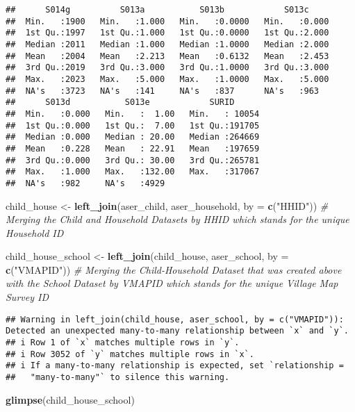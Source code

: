 \documentclass[
]{article}
\newenvironment{Shaded}{\begin{snugshade}}{\end{snugshade}}
\newcommand{\AttributeTok}[1]{\textcolor[rgb]{0.13,0.29,0.53}{#1}}
\newcommand{\CommentTok}[1]{\textcolor[rgb]{0.56,0.35,0.01}{\textit{#1}}}
\newcommand{\FunctionTok}[1]{\textcolor[rgb]{0.13,0.29,0.53}{\textbf{#1}}}
\newcommand{\NormalTok}[1]{#1}
\newcommand{\OtherTok}[1]{\textcolor[rgb]{0.56,0.35,0.01}{#1}}
\newcommand{\StringTok}[1]{\textcolor[rgb]{0.31,0.60,0.02}{#1}}
\begin{document}
\begin{verbatim}
##      S014g          S013a           S013b            S013c      
##  Min.   :1900   Min.   :1.000   Min.   :0.0000   Min.   :0.000  
##  1st Qu.:1997   1st Qu.:1.000   1st Qu.:0.0000   1st Qu.:2.000  
##  Median :2011   Median :1.000   Median :1.0000   Median :2.000  
##  Mean   :2004   Mean   :2.213   Mean   :0.6132   Mean   :2.453  
##  3rd Qu.:2019   3rd Qu.:3.000   3rd Qu.:1.0000   3rd Qu.:3.000  
##  Max.   :2023   Max.   :5.000   Max.   :1.0000   Max.   :5.000  
##  NA's   :3723   NA's   :141     NA's   :837      NA's   :963    
##      S013d           S013e            SURID       
##  Min.   :0.000   Min.   :  1.00   Min.   : 10054  
##  1st Qu.:0.000   1st Qu.:  7.00   1st Qu.:191705  
##  Median :0.000   Median : 20.00   Median :264669  
##  Mean   :0.228   Mean   : 22.91   Mean   :197659  
##  3rd Qu.:0.000   3rd Qu.: 30.00   3rd Qu.:265781  
##  Max.   :1.000   Max.   :132.00   Max.   :317067  
##  NA's   :982     NA's   :4929
\end{verbatim}

\begin{Shaded}
\begin{Highlighting}[]
\NormalTok{child\_house }\OtherTok{\textless{}{-}} \FunctionTok{left\_join}\NormalTok{(aser\_child, aser\_household, }\AttributeTok{by =} \FunctionTok{c}\NormalTok{(}\StringTok{"HHID"}\NormalTok{)) }\CommentTok{\# Merging the Child and Household Datasets by HHID which stands for the unique Household ID}

\NormalTok{child\_house\_school }\OtherTok{\textless{}{-}} \FunctionTok{left\_join}\NormalTok{(child\_house, aser\_school, }\AttributeTok{by =} \FunctionTok{c}\NormalTok{(}\StringTok{"VMAPID"}\NormalTok{)) }\CommentTok{\# Merging the Child{-}Household Dataset that was created above with the School Dataset by VMAPID which stands for the unique Village Map Survey ID}
\end{Highlighting}
\end{Shaded}

\begin{verbatim}
## Warning in left_join(child_house, aser_school, by = c("VMAPID")): Detected an unexpected many-to-many relationship between `x` and `y`.
## i Row 1 of `x` matches multiple rows in `y`.
## i Row 3052 of `y` matches multiple rows in `x`.
## i If a many-to-many relationship is expected, set `relationship =
##   "many-to-many"` to silence this warning.
\end{verbatim}

\begin{Shaded}
\begin{Highlighting}[]
\FunctionTok{glimpse}\NormalTok{(child\_house\_school)}
\end{Highlighting}
\end{Shaded}
\end{document}
